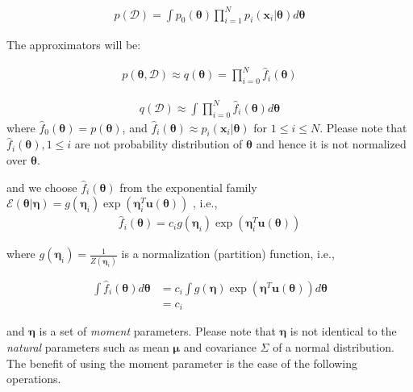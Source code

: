 \documentclass[a4]{article}
\begin{document}
\begin{equation}
\begin{aligned}
p(\mathcal{D}) = \int p_0(\bm{\theta})\prod_{i=1}^{N}p_i(\bm{x}_i|\bm{\theta})d\bm{\theta}
\label{eq:prior}
\end{aligned}
\end{equation}

The approximators will be:

\begin{equation}
\begin{aligned}
p(\bm{\theta} , \mathcal{D}) \approx
q(\bm{\theta}) =\prod_{i=0}^{N}\hat{f}_i(\bm{\theta})
\end{aligned}
\end{equation}

\begin{equation}
\begin{aligned}
q(\mathcal{D}) \approx \int \prod_{i=0}^{N}\hat{f}_i(\bm{\theta}) d\bm{\theta}
\end{aligned}
\end{equation}
where $\hat{f}_0(\bm{\theta}) = p(\bm{\theta})$, and $\hat{f}_i(\bm{\theta}) \approx p_i(\bm{x}_i|\bm{\theta})$
for $1 \le i \le N$.
Please note that $\hat{f}_i(\bm{\theta}), 1 \le i$ are not probability distribution of $\bm{\theta}$ and hence
it is not normalized over $\bm{\theta}$.

and we choose $\hat{f}_i(\bm{\theta})$ from the exponential family 
$\mathcal{E}(\bm{\theta}|\bm{\eta}) = g(\bm{\eta}_i)\exp\left(\bm{\eta}_i^T\bm{u}(\bm{\theta})\right)$
, i.e.,
\begin{equation}
\begin{aligned}
\hat{f}_i(\bm{\theta}) = c_ig(\bm{\eta}_i)\exp\left(\bm{\eta}_i^T\bm{u}(\bm{\theta})\right)
\end{aligned}
\end{equation}

where $g(\bm{\eta}_i) = \frac{1}{Z(\bm{\eta}_i)}$ is a normalization (partition) function, i.e.,

\begin{equation}
\begin{aligned}
\int \hat{f}_i(\bm{\theta}) d\bm{\theta} 
&= c_i\int g(\bm{\eta})\exp\left(\bm{\eta}^T\bm{u}(\bm{\theta})\right)d\bm{\theta}\\
&= c_i
\end{aligned}
\end{equation}

and $\bm{\eta}$ is a set of \emph{moment} parameters.
Please note that $\bm{\eta}$ is not identical to the \emph{natural} parameters such as mean 
$\bm{\mu}$ and covariance $\Sigma$ of a normal distribution.
The benefit of using the moment parameter is the ease of the following operations.
\end{document}
